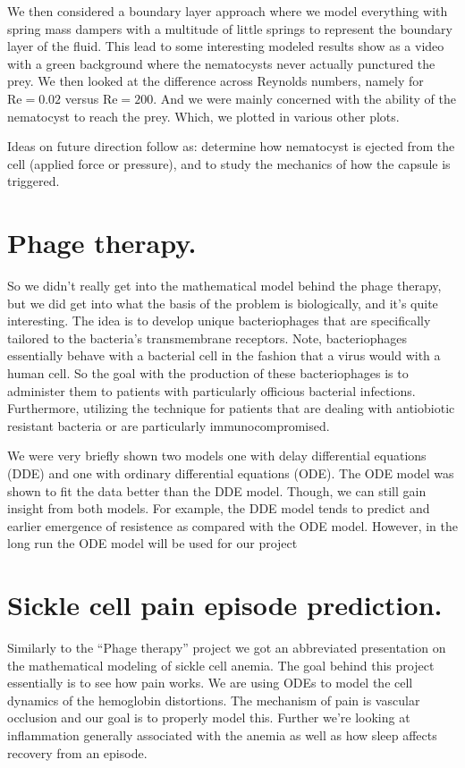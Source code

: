 \documentclass[12pt]{amsart}
\begin{document}
\begin{onehalfspace}
        We then considered a boundary layer approach where we model everything with spring mass dampers with a
        multitude of little springs to represent the boundary layer of the fluid.
        This lead to some interesting modeled results show as a video with a green background where the nematocysts
        never actually punctured the prey.
        We then looked at the difference across Reynolds numbers, namely for $\text{Re} = 0.02$ versus
        $\text{Re} = 200$.
        And we were mainly concerned with the ability of the nematocyst to reach the prey.
        Which, we plotted in various other plots.

        Ideas on future direction follow as: determine how nematocyst is ejected from the cell (applied
        force or pressure), and to study the mechanics of how the capsule is triggered.

        \section{Phage therapy.}
        So we didn't really get into the mathematical model behind the phage therapy, but we did get
        into what the basis of the problem is biologically, and it's quite interesting.
        The idea is to develop unique bacteriophages that are specifically tailored to the bacteria's
        transmembrane receptors.
        Note, bacteriophages essentially behave with a bacterial cell in the fashion that a virus
        would with a human cell.
        So the goal with the production of these bacteriophages is to administer them to patients
        with particularly officious bacterial infections.
        Furthermore, utilizing the technique for patients that are dealing with antiobiotic resistant
        bacteria or are particularly immunocompromised.

        We were very briefly shown two models one with delay differential equations (DDE) and one with
        ordinary differential equations (ODE).
        The ODE model was shown to fit the data better than the DDE model.
        Though, we can still gain insight from both models.
        For example, the DDE model tends to predict and earlier emergence of resistence as compared
        with the ODE model.
        However, in the long run the ODE model will be used for our project

        \section{Sickle cell pain episode prediction.}
        Similarly to the ``Phage therapy'' project we got an abbreviated presentation on the
        mathematical modeling of sickle cell anemia.
        The goal behind this project essentially is to see how pain works.
        We are using ODEs to model the cell dynamics of the hemoglobin distortions.
        The mechanism of pain is vascular occlusion and our goal is to properly model this.
        Further we're looking at inflammation generally associated with the anemia as well as
        how sleep affects recovery from an episode.

    \end{onehalfspace}
\end{document}
